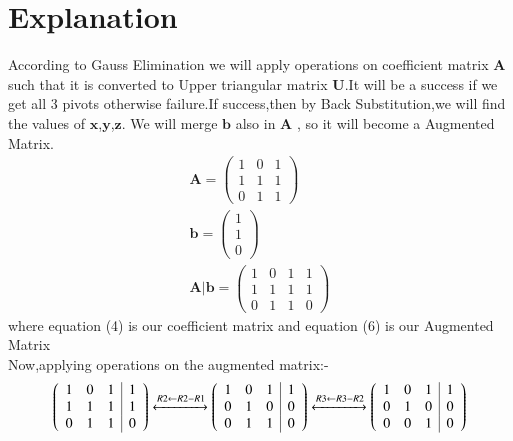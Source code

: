 \documentclass[journal,12pt,twocolumn]{IEEEtran}
\begin{document}
\section{Explanation}
According to Gauss Elimination we will apply operations on coefficient matrix $\mathbf{A}$ such that it is converted to Upper triangular matrix $\mathbf{U}$.It will be a success if we get all 3 pivots otherwise failure.If success,then by Back Substitution,we will find the values of $\mathbf{x}$,$\mathbf{y}$,$\mathbf{z}$. We will merge $\mathbf{b}$ also in $\mathbf{A}$ , so it will become a Augmented Matrix. 
\begin{align}
 \mathbf{A}=\begin{pmatrix}
1 & 0 & 1\\
1 & 1 & 1\\
0 & 1 & 1
\end{pmatrix}\\
\mathbf{b}=\begin{pmatrix}
1\\
1\\
0
\end{pmatrix}\\
\mathbf{A}|\mathbf{b}=\left(\begin{array}{ccc|c}  
 1 & 0 & 1 & 1\\  
 1 & 1 & 1 & 1\\
 0 & 1 & 1 & 0
\end{array}\right)
\end{align}
where equation (4) is our coefficient matrix and equation (6) is our Augmented Matrix\\
Now,applying operations on the augmented matrix:-
\begin{align}
   \left(\begin{array}{ccc|c}  
 1 & 0 & 1 & 1\\  
 1 & 1 & 1 & 1\\
 0 & 1 & 1 & 0
\end{array}\right)\xleftrightarrow[]{R2\leftarrow R2-R1} \left(\begin{array}{ccc|c}  
 1 & 0 & 1 & 1\\  
 0 & 1 & 0 & 0\\
 0 & 1 & 1 & 0
\end{array}\right)\xleftrightarrow[]{R3\leftarrow R3-R2}\left(\begin{array}{ccc|c}  
 1 & 0 & 1 & 1\\  
 0 & 1 & 0 & 0\\
 0 & 0 & 1 & 0
\end{array}\right)
\end{align}
\end{document}
